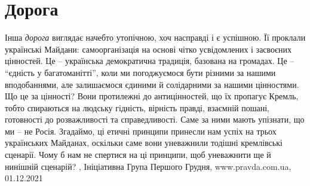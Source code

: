  
 
 
 
 
\chapter{Дорога}
\label{sec:slova.doroga}

Інша \emph{дорога} виглядає начебто утопічною, хоч насправді і є успішною. Її проклали
українські Майдани: самоорганізація на основі чітко усвідомлених і засвоєних
цінностей. Це – українська демократична традиція, базована на громадах. Це –
\enquote{єдність у багатоманітті}, коли ми погоджуємося бути різними за нашими
вподобаннями, але залишаємося єдиними й солідарними за нашими цінностями.  Що
це за цінності? Вони протилежні до антицінностей, що їх пропагує Кремль, тобто
спираються на людську гідність, вірність правді, взаємній пошані, готовності до
розважливості та справедливості. Саме за ними мають упізнати, що ми – не Росія.
Згадаймо, ці етичні принципи принесли нам успіх на трьох українських Майданах,
оскільки саме вони уневажнили тодішні кремлівські сценарії. Чому б нам не
спертися на ці принципи, щоб уневажнити ще й нинішній сценарій?
, 
Ініціативна Група Першого Грудня, www.pravda.com.ua, 01.12.2021
